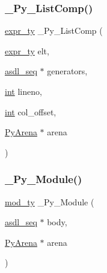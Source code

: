 \mbox{\label{_python-ast_8h_ae1343d568a74770d89054de3b27a689e}} 
\subsubsection{\texorpdfstring{\_Py\_ListComp()}{\_Py\_ListComp()}}
{\footnotesize\ttfamily \mbox{\hyperlink{_python-ast_8h_a56d3705e020a071405094a220c4592bd}{expr\+\_\+ty}} \+\_\+\+Py\+\_\+\+List\+Comp (\begin{DoxyParamCaption}\item[{\mbox{\hyperlink{_python-ast_8h_a56d3705e020a071405094a220c4592bd}{expr\+\_\+ty}}}]{elt,  }\item[{\mbox{\hyperlink{structasdl__seq}{asdl\+\_\+seq}} $\ast$}]{generators,  }\item[{\mbox{\hyperlink{warnings_8h_a74f207b5aa4ba51c3a2ad59b219a423b}{int}}}]{lineno,  }\item[{\mbox{\hyperlink{warnings_8h_a74f207b5aa4ba51c3a2ad59b219a423b}{int}}}]{col\+\_\+offset,  }\item[{\mbox{\hyperlink{pyarena_8h_a9edeb357fbb27333471022a0975adb7a}{Py\+Arena}} $\ast$}]{arena }\end{DoxyParamCaption})}

\mbox{\label{_python-ast_8h_ac22a9146d597c59e94e9511dd4db4772}} 
\subsubsection{\texorpdfstring{\_Py\_Module()}{\_Py\_Module()}}
{\footnotesize\ttfamily \mbox{\hyperlink{_python-ast_8h_ac5ca223bf2573144610f74dc91fc431e}{mod\+\_\+ty}} \+\_\+\+Py\+\_\+\+Module (\begin{DoxyParamCaption}\item[{\mbox{\hyperlink{structasdl__seq}{asdl\+\_\+seq}} $\ast$}]{body,  }\item[{\mbox{\hyperlink{pyarena_8h_a9edeb357fbb27333471022a0975adb7a}{Py\+Arena}} $\ast$}]{arena }\end{DoxyParamCaption})}

\mbox{\label{_python-ast_8h_add305b1df2f60623616644e2bc5c4c96}} 
